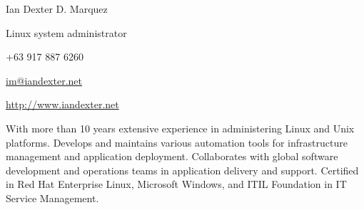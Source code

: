 \documentclass[10pt, a4paper, final]{article}
\begin{document}
\begin{minipage}[c]{0.5\textwidth}
  \begin{flushleft}\begin{spacing}{1}
    \Huge Ian Dexter D. Marquez

    \Large Linux system administrator
  \end{spacing}\end{flushleft}
\end{minipage}
\begin{minipage}[c]{0.5\textwidth}
  \begin{flushright}\begin{spacing}{1}\small
    +63 917 887 6260 

    \href{mailto:im@iandexter.net}{im@iandexter.net} 

    \href{http://www.iandexter.net}{http://www.iandexter.net} 
  \end{spacing}\end{flushright}
\end{minipage}
\vspace{1em}
\hrulefill

With more than 10 years extensive experience in administering Linux and Unix platforms. Develops and maintains various automation tools for infrastructure management and application deployment. Collaborates with global software development and operations teams in application delivery and support. Certified in Red Hat Enterprise Linux, Microsoft Windows, and ITIL Foundation in IT Service Management.

\vspace{1.5em}
\end{document}
